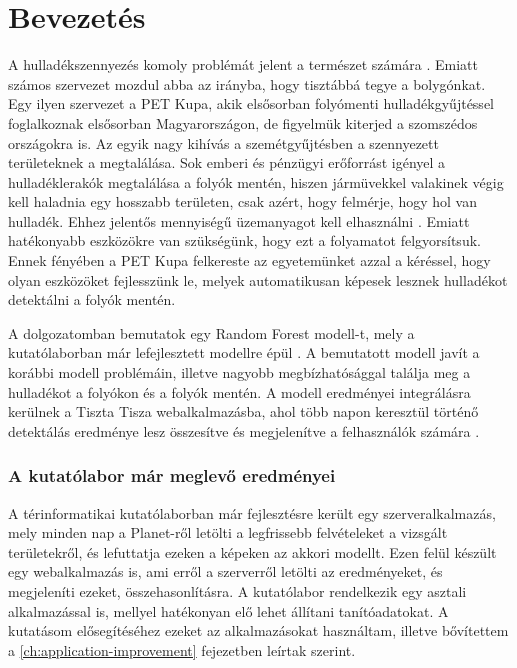 \chapter{Bevezetés}
\label{ch:intro}

A hulladékszennyezés komoly problémát jelent a természet számára \cite{kibria2023PlasticWaste}. Emiatt számos szervezet mozdul abba az irányba, hogy tisztábbá tegye a bolygónkat. Egy ilyen szervezet a PET Kupa, akik elsősorban folyómenti hulladékgyűjtéssel foglalkoznak elsősorban Magyarországon, de figyelmük kiterjed a szomszédos országokra is. Az egyik nagy kihívás a szemétgyűjtésben a szennyezett területeknek a megtalálása. Sok emberi és pénzügyi erőforrást igényel a hulladéklerakók megtalálása a folyók mentén, hiszen jármüvekkel valakinek végig kell haladnia egy hosszabb területen, csak azért, hogy felmérje, hogy hol van hulladék. Ehhez jelentős mennyiségű üzemanyagot kell elhasználni . Emiatt hatékonyabb eszközökre van szükségünk, hogy ezt a folyamatot felgyorsítsuk. Ennek fényében a PET Kupa felkereste az egyetemünket azzal a kéréssel, hogy olyan eszközöket fejlesszünk le, melyek automatikusan képesek lesznek hulladékot detektálni a folyók mentén.

A dolgozatomban bemutatok egy Random Forest modell-t\cite{breiman2001}, mely a kutatólaborban már lefejlesztett modellre épül \cite{magyar2023}. A bemutatott modell javít a korábbi modell problémáin, illetve nagyobb megbízhatósággal találja meg a hulladékot a folyókon és a folyók mentén. A modell eredményei integrálásra kerülnek a Tiszta Tisza webalkalmazásba, ahol több napon keresztül történő detektálás eredménye lesz összesítve és megjelenítve a felhasználók számára .

\subsection{A kutatólabor már meglevő eredményei}

A térinformatikai kutatólaborban már fejlesztésre került egy szerveralkalmazás, mely minden nap a Planet-ről letölti a legfrissebb felvételeket a vizsgált területekről, és lefuttatja ezeken a képeken az akkori modellt. Ezen felül készült egy webalkalmazás is, ami erről a szerverről letölti az eredményeket, és megjeleníti ezeket, összehasonlításra. A kutatólabor rendelkezik egy asztali alkalmazással is, mellyel hatékonyan elő lehet állítani tanítóadatokat. A kutatásom elősegítéséhez ezeket az alkalmazásokat használtam, illetve bővítettem a \ref{ch:application-improvement} fejezetben leírtak szerint.